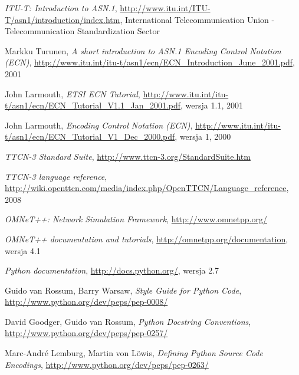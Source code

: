 \documentclass[00-praca-magisterska.tex]{subfiles}
\begin{document}
\begin{thebibliography}{9}






  \emph{ITU-T: Introduction to ASN.1},
  \url{http://www.itu.int/ITU-T/asn1/introduction/index.htm},
  International Telecommunication Union - Telecommunication Standardization Sector

  Markku Turunen,
  \emph{A short introduction to ASN.1 Encoding Control Notation (ECN)},
  \url{http://www.itu.int/itu-t/asn1/ecn/ECN_Introduction_June_2001.pdf},
  2001

  John Larmouth,
  \emph{ETSI ECN Tutorial},
  \url{http://www.itu.int/itu-t/asn1/ecn/ECN_Tutorial_V1.1_Jan_2001.pdf},
  wersja 1.1,
  2001

  John Larmouth,
  \emph{Encoding Control Notation (ECN)},
  \url{http://www.itu.int/itu-t/asn1/ecn/ECN_Tutorial_V1_Dec_2000.pdf},
  wersja 1, 
  2000

  \emph{TTCN-3 Standard Suite},
  \url{http://www.ttcn-3.org/StandardSuite.htm}

  \emph{TTCN-3 language reference},
  \url{http://wiki.openttcn.com/media/index.php/OpenTTCN/Language_reference},
  2008

  \emph{OMNeT++: Network Simulation Framework},
  \url{http://www.omnetpp.org/}

  \emph{OMNeT++ documentation and tutorials},
  \url{http://omnetpp.org/documentation},
  wersja 4.1

  \emph{Python documentation}, 
  \url{http://docs.python.org/},
  wersja 2.7

  Guido van Rossum, Barry Warsaw,
  \emph{Style Guide for Python Code},
  \url{http://www.python.org/dev/peps/pep-0008/}

  David Goodger, Guido van Rossum,
  \emph{Python Docstring Conventions},
  \url{http://www.python.org/dev/peps/pep-0257/}

  Marc-André Lemburg, Martin von Löwis,
  \emph{Defining Python Source Code Encodings},
  \url{http://www.python.org/dev/peps/pep-0263/}


\end{thebibliography}
\end{document}
